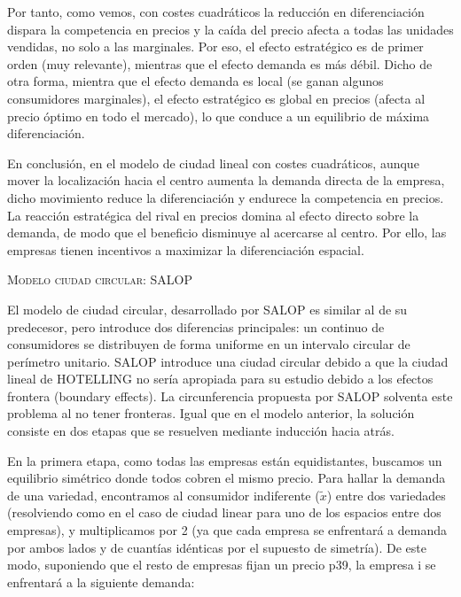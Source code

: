 \documentclass[10pt,a4paper]{article}
\begin{document}
Por tanto, como vemos, con costes cuadráticos la reducción en diferenciación dispara la competencia en precios y la caída del precio afecta a todas las unidades vendidas, no solo a las marginales. Por eso, el efecto estratégico es de primer orden (muy relevante), mientras que el efecto demanda es más débil. Dicho de otra forma, mientra que el efecto demanda es local (se ganan algunos consumidores marginales), el efecto estratégico es global en precios (afecta al precio óptimo en todo el mercado), lo que conduce a un equilibrio de máxima diferenciación.

En conclusión, en el modelo de ciudad lineal con costes cuadráticos, aunque mover la localización hacia el centro aumenta la demanda directa de la empresa, dicho movimiento reduce la diferenciación y endurece la competencia en precios. La reacción estratégica del rival en precios domina al efecto directo sobre la demanda, de modo que el beneficio disminuye al acercarse al centro. Por ello, las empresas tienen incentivos a maximizar la diferenciación espacial.

\textsc{Modelo ciudad circular: SALOP}

El modelo de ciudad circular, desarrollado por SALOP es similar al de su predecesor, pero introduce dos diferencias principales: un continuo de consumidores se distribuyen de forma uniforme en un intervalo circular de perímetro unitario. SALOP introduce una ciudad circular debido a que la ciudad lineal de HOTELLING no sería apropiada para su estudio debido a los efectos frontera (boundary effects). La circunferencia propuesta por SALOP solventa este problema al no tener fronteras. Igual que en el modelo anterior, la solución consiste en dos etapas que se resuelven mediante inducción hacia atrás. 

En la primera etapa, como todas las empresas están equidistantes, buscamos un equilibrio simétrico donde todos cobren el mismo precio. Para hallar la demanda de una variedad, encontramos al consumidor indiferente ($\tilde x$) entre dos variedades (resolviendo como en el caso de ciudad linear para uno de los espacios entre dos empresas), y multiplicamos por 2 (ya que cada empresa se enfrentará a demanda por ambos lados y de cuantías idénticas por el supuesto de simetría). De este modo, suponiendo que el resto de empresas fijan un precio p39, la empresa i se enfrentará a la siguiente demanda:
\end{document}
